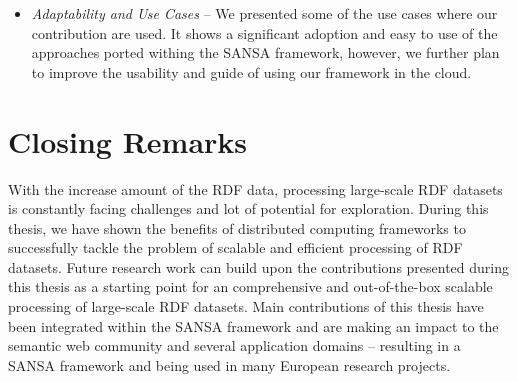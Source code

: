\begin{itemize}
    \item \textit{Adaptability and Use Cases} -- 
    We presented some of the use cases where our contribution are used. 
    It shows a significant adoption and easy to use of the approaches ported withing the SANSA framework, however, we further plan to improve the usability and guide of using our framework in the cloud.
\end{itemize}

\section{Closing Remarks}
With the increase amount of the \gls{RDF} data, processing large-scale \gls{RDF} datasets is constantly facing challenges and lot of potential for exploration.
During this thesis, we have shown the benefits of distributed computing frameworks to successfully tackle the problem of scalable and efficient processing of \gls{RDF} datasets.
Future research work can build upon the contributions presented during this thesis as a starting point for an comprehensive and out-of-the-box scalable processing of large-scale \gls{RDF} datasets.
Main contributions of this thesis have been integrated within the SANSA framework and are making an impact to the semantic web community and several application domains -- resulting in a SANSA framework and being used in many European research projects.


